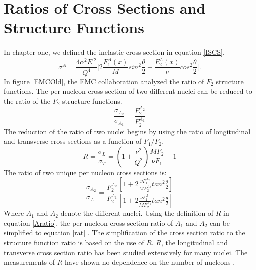 \section{Ratios of Cross Sections and Structure Functions}
\paragraph{}In chapter one, we defined the inelastic cross section in equation \ref{ISCS}.  
\begin{equation}
\label{ISCSch2}
\sigma^A=\frac{4\alpha^2E^{\prime 2}}{Q^4} \bigg\lbrack 2\frac{F_1^A(x)}{M}sin^2\frac{\theta}{2} + \frac{F_2^A(x)}{\nu}cos^2\frac{\theta}{2} \bigg \rbrack.
\end{equation} 
In figure \ref{EMCOld}, the EMC collaboration analyzed the ratio of $F_2$ structure functions. The per nucleon cross section of two different nuclei can be reduced to the ratio of the $F_2$ structure functions.  
\begin{equation}
\label{rat}
\frac{\sigma_{A_2}}{\sigma_{A_1}} = \frac{F_2^{A_2}}{F_2^{A_1}}
\end{equation}
The reduction of the ratio of two nuclei begins by using the ratio of longitudinal and transverse cross sections as a function of $F_1/F_2$.
\begin{equation}
R=\frac{\sigma_{L}}{\sigma_{T}} =\left(1+\frac{\nu^2}{Q^2} \right)\frac{MF_2}{\nu F_1} -1
\label{Rratio}
\end{equation}
The ratio of two unique per nucleon cross sections is:
\begin{equation}
\label{Aratio}
\frac{\sigma_{A_2}}{\sigma_{A_1}} = \frac{F_2^{A_2}}{F_2^{A_1}} \frac{\left[1+ 2\frac{\nu F_1^{A_2} }{MF_2^{A_2}} tan^2\frac{\theta}{2} \right]}{\left[1+ 2\frac{\nu F_1^{A_1} }{MF_2^{A_1}} tan^2\frac{\theta}{2} \right]}
\end{equation}
Where $A_1$ and $A_2$ denote the different nuclei. Using the definition of $R$ in equation \ref{Aratio}, the per nucleon cross section ratio of $A_1$ and $A_2$ can be simplified to equation \ref{rat} \cite{EM,seelyth}. The simplification of the cross section ratio to the structure function ratio is based on the use of $R$. $R$, the longitudinal and transverse cross section ratio has been studied extensively for many nuclei. The measurements of $R$ have shown no dependence on the number of nucleons \cite{EM}. 
